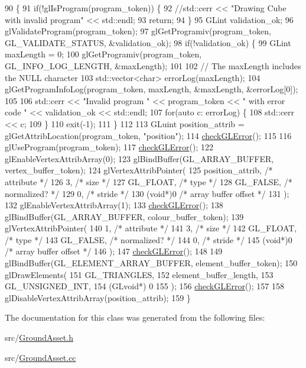 \begin{DoxyCode}
90                                            \{
91   \textcolor{keywordflow}{if}(!glIsProgram(program\_token)) \{
92     \textcolor{comment}{//std::cerr << "Drawing Cube with invalid program" << std::endl;}
93     \textcolor{keywordflow}{return};
94   \}
95   GLint validation\_ok;
96   glValidateProgram(program\_token);
97   glGetProgramiv(program\_token, GL\_VALIDATE\_STATUS, &validation\_ok);
98   \textcolor{keywordflow}{if}(!validation\_ok) \{
99     GLint maxLength = 0;
100     glGetProgramiv(program\_token, GL\_INFO\_LOG\_LENGTH, &maxLength);
101 
102     \textcolor{comment}{// The maxLength includes the NULL character}
103     std::vector<char> errorLog(maxLength);
104     glGetProgramInfoLog(program\_token, maxLength, &maxLength, &errorLog[0]);
105 
106     std::cerr << \textcolor{stringliteral}{"Invalid program "} << program\_token << \textcolor{stringliteral}{" with error code "} << validation\_ok << std::endl;
107     \textcolor{keywordflow}{for}(\textcolor{keyword}{auto} c: errorLog) \{
108       std::cerr << c;
109     \}
110     exit(-1);
111   \}
112 
113   GLuint position\_attrib = glGetAttribLocation(program\_token, \textcolor{stringliteral}{"position"});
114   \hyperlink{_ground_asset_8cc_a75f201b0e53e68726854997957322b8d}{checkGLError}();
115 
116   glUseProgram(program\_token);
117   \hyperlink{_ground_asset_8cc_a75f201b0e53e68726854997957322b8d}{checkGLError}();
122   glEnableVertexAttribArray(0);
123   glBindBuffer(GL\_ARRAY\_BUFFER, vertex\_buffer\_token);
124   glVertexAttribPointer(
125     position\_attrib,        \textcolor{comment}{/* attribute */}
126     3,        \textcolor{comment}{/* size */}
127     GL\_FLOAT,   \textcolor{comment}{/* type */}
128     GL\_FALSE,   \textcolor{comment}{/* normalized? */}
129     0,        \textcolor{comment}{/* stride */}
130     (\textcolor{keywordtype}{void}*)0    \textcolor{comment}{/* array buffer offset */}
131   );
132   glEnableVertexAttribArray(1);
133   \hyperlink{_ground_asset_8cc_a75f201b0e53e68726854997957322b8d}{checkGLError}();
138   glBindBuffer(GL\_ARRAY\_BUFFER, colour\_buffer\_token);
139   glVertexAttribPointer(
140     1,        \textcolor{comment}{/* attribute */}
141     3,        \textcolor{comment}{/* size */}
142     GL\_FLOAT,   \textcolor{comment}{/* type */}
143     GL\_FALSE,   \textcolor{comment}{/* normalized? */}
144     0,        \textcolor{comment}{/* stride */}
145     (\textcolor{keywordtype}{void}*)0    \textcolor{comment}{/* array buffer offset */}
146   );
147   \hyperlink{_ground_asset_8cc_a75f201b0e53e68726854997957322b8d}{checkGLError}();
148 
149   glBindBuffer(GL\_ELEMENT\_ARRAY\_BUFFER, element\_buffer\_token);
150   glDrawElements(
151     GL\_TRIANGLES,
152     element\_buffer\_length,
153     GL\_UNSIGNED\_INT,
154     (GLvoid*) 0
155   );
156   \hyperlink{_ground_asset_8cc_a75f201b0e53e68726854997957322b8d}{checkGLError}();
157 
158   glDisableVertexAttribArray(position\_attrib);
159 \}
\end{DoxyCode}


The documentation for this class was generated from the following files\+:\begin{DoxyCompactItemize}
\item 
src/\hyperlink{_ground_asset_8h}{Ground\+Asset.\+h}\item 
src/\hyperlink{_ground_asset_8cc}{Ground\+Asset.\+cc}\end{DoxyCompactItemize}
